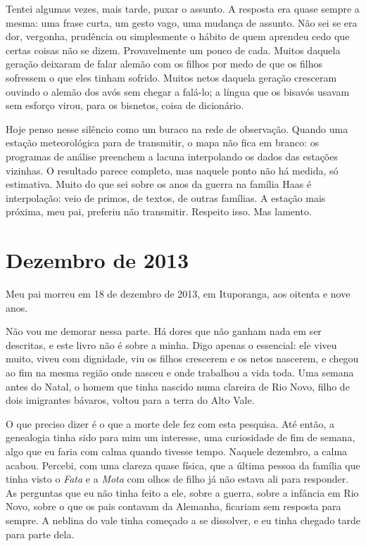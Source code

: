 \documentclass[
  brazilian,
  11pt,
  openany]{book}
\begin{document}
Tentei algumas vezes, mais tarde, puxar o assunto. A resposta era quase
sempre a mesma: uma frase curta, um gesto vago, uma mudança de assunto.
Não sei se era dor, vergonha, prudência ou simplesmente o hábito de quem
aprendeu cedo que certas coisas não se dizem. Provavelmente um pouco de
cada. Muitos daquela geração deixaram de falar alemão com os filhos por
medo de que os filhos sofressem o que eles tinham sofrido. Muitos netos
daquela geração cresceram ouvindo o alemão dos avós sem chegar a
falá-lo; a língua que os bisavós usavam sem esforço virou, para os
bisnetos, coisa de dicionário.

Hoje penso nesse silêncio como um buraco na rede de observação. Quando
uma estação meteorológica para de transmitir, o mapa não fica em branco:
os programas de análise preenchem a lacuna interpolando os dados das
estações vizinhas. O resultado parece completo, mas naquele ponto não há
medida, só estimativa. Muito do que sei sobre os anos da guerra na
família Haas é interpolação: veio de primos, de textos, de outras
famílias. A estação mais próxima, meu pai, preferiu não transmitir.
Respeito isso. Mas lamento.

\section{Dezembro de 2013}\label{dezembro-de-2013}

Meu pai morreu em 18 de dezembro de 2013, em Ituporanga, aos oitenta e
nove anos.

Não vou me demorar nessa parte. Há dores que não ganham nada em ser
descritas, e este livro não é sobre a minha. Digo apenas o essencial:
ele viveu muito, viveu com dignidade, viu os filhos crescerem e os netos
nascerem, e chegou ao fim na mesma região onde nasceu e onde trabalhou a
vida toda. Uma semana antes do Natal, o homem que tinha nascido numa
clareira de Rio Novo, filho de dois imigrantes bávaros, voltou para a
terra do Alto Vale.

O que preciso dizer é o que a morte dele fez com esta pesquisa. Até
então, a genealogia tinha sido para mim um interesse, uma curiosidade de
fim de semana, algo que eu faria com calma quando tivesse tempo. Naquele
dezembro, a calma acabou. Percebi, com uma clareza quase física, que a
última pessoa da família que tinha visto o \emph{Fata} e a \emph{Mota}
com olhos de filho já não estava ali para responder. As perguntas que eu
não tinha feito a ele, sobre a guerra, sobre a infância em Rio Novo,
sobre o que os pais contavam da Alemanha, ficariam sem resposta para
sempre. A neblina do vale tinha começado a se dissolver, e eu tinha
chegado tarde para parte dela.
\end{document}
